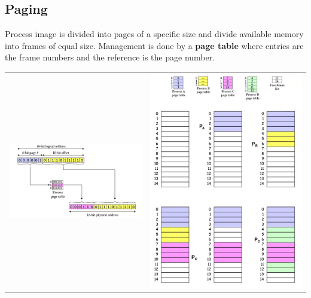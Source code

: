 	\subsection{Paging }
		Process image is divided into pages of a specific size and divide available memory into frames of equal size. Management is done by a \textbf{page table} where entries are the frame numbers and the reference is the page number. 
		
		\begin{tabular}{p{}p{}}
			\includegraphics[scale=0.55]{./pictures/pagingAddressTrans.png}
			&
			\includegraphics[scale=0.9]{./pictures/paging.png}
		\end{tabular}	
		